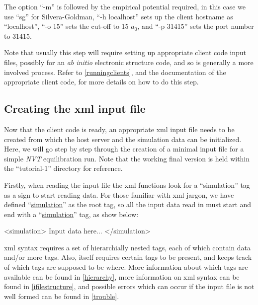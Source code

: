 \documentclass[11pt,english,fleqn]{report}
\newenvironment{code}{%
\footnotesize 
\verbatim
}{
\endverbatim
\normalsize
}
\begin{document}
The option {}``-m'' is followed by the empirical potential required,
in this case we use {}``sg'' for Silvera-Goldman, 
{}``-h localhost'' sets up the client hostname
as {}``localhost'', {}``-o 15'' sets the cut-off to 15 \(a_0\), 
and {}``-p 31415'' sets the port number to 31415. 

Note that usually this step will require setting up appropriate
client code input files, possibly for an \emph{ab initio} electronic
structure code, and so is generally a more involved process. Refer
to \ref{runningclients}, and the documentation of the appropriate
client code, for more details on how to do this step.


\subsection{Creating the xml input file}

Now that the client code is ready, an appropriate xml input file needs
to be created from which the host server and the simulation data can
be initialized. Here, we will go step by step through the creation
of a minimal input file for a simple \emph{NVT} equilibration run. Note that
the working final version is held within the {}``tutorial-1'' directory
for reference.

Firstly, when reading the input file the \ipi xml functions look
for a {}``simulation''
tag as a sign to start reading data. For those familiar with xml jargon,
we have defined {}``\hyperref[SIMULATION]{simulation}'' as the 
root tag, so all the input data read in must start and end with a 
{}``\hyperref[SIMULATION]{simulation}'' tag, as show below:

\begin{code}
<simulation>
   Input data here...
</simulation>
\end{code}

xml syntax requires a set of hierarchially nested tags, each of which
contain data and/or more tags. Also, \ipi itself requires certain
tags to be present, and keeps track of which tags are supposed to
be where. More information about which tags are available can be found
in \ref{hierarchy}, more information on xml syntax can be found in
\ref{ifilestructure}, and possible errors which can occur if the
input file is not well formed can be found in \ref{trouble}. 
\end{document}
